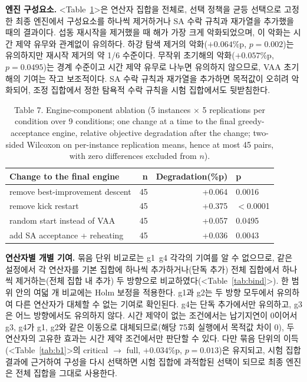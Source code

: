 \documentclass[10pt,a4paper]{article}
\begin{document}
\textbf{엔진 구성요소.} <Table~\ref{tab:b2}>은 연산자 집합을 전체로, 선택 정책을 균등 선택으로 고정한 최종 엔진에서 구성요소를 하나씩 제거하거나 SA 수락 규칙과 재가열을 추가했을 때의 결과이다. 섭동 재시작을 제거했을 때 해가 가장 크게 악화되었으며, 이 악화는 시간 제약 유무와 관계없이 유의하다.
하강 탐색 제거의 악화($+0.064$\%p, $p=0.002$)는 유의하지만 재시작 제거의 약 1/6 수준이다. 무작위 초기해의
악화($+0.057$\%p, $p=0.0495$)는 경계 수준이고 시간 제약 유무로 나누면 유의하지 않으므로, VAA 초기해의 기여는
작고 보조적이다. SA 수락 규칙과 재가열을 추가하면 목적값이 오히려
악화되어, 조정 집합에서 정한 탐욕적 수락 규칙을 시험 집합에서도 뒷받침한다.

\begin{table}[H]\centering
\caption{Table 7. Engine-component ablation (5 instances $\times$ 5 replications per condition over 9 conditions; one change at a time to the final greedy-acceptance engine, relative objective degradation after the change; two-sided Wilcoxon on per-instance replication means, hence at most 45 pairs, with zero differences excluded from $n$).}
\label{tab:b2}\small
\begin{tabular}{@{}lrrl@{}}
\toprule
Change to the final engine & n & Degradation(\%p) & p\\
\midrule
remove best-improvement descent & 45 & +0.064 & 0.0016\\
remove kick restart & 45 & +0.375 & $<$0.0001\\
random start instead of VAA & 45 & +0.057 & 0.0495\\
add SA acceptance + reheating & 45 & +0.036 & 0.0043\\
\bottomrule
\end{tabular}
\end{table}


\textbf{연산자별 개별 기여.} 묶음 단위 비교로는 g1~g4 각각의 기여를 알 수 없으므로, 같은 설정에서
각 연산자를 기본 집합에 하나씩 추가하거나(단독 추가) 전체 집합에서 하나씩 제거하는(전체 집합 내 추가)
두 방향으로 비교하였다(<Table~\ref{tab:bind}>). 한 범위 안의 여덟 개 비교에는 Holm 보정을 적용한다.
g1과 g2는 두 방향 모두에서 유의하여 다른 연산자가 대체할 수 없는 기여로 확인된다. g4는 단독 추가에서만
유의하고, g3은 어느 방향에서도 유의하지 않다. 시간 제약이 없는 조건에서는 납기지연이 0이어서 g3, g4가
g1, g2와 같은 이동으로 대체되므로(해당 75회 실행에서 목적값 차이 0), 두 연산자의 고유한 효과는 시간 제약
조건에서만 판단할 수 있다. 다만 묶음 단위의 이득(<Table~\ref{tab:b1}>의 critical $\rightarrow$ full, $+0.034$\%p,
$p=0.013$)은 유지되고, 시험 집합 결과에 근거하여 구성을 다시 선택하면 시험 집합에 과적합된 선택이 되므로 최종 엔진은
전체 집합을 그대로 사용한다.
\end{document}
